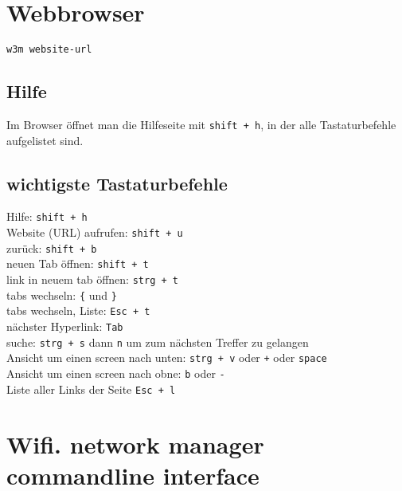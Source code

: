 \documentclass[]{book}
\begin{document}
\hypertarget{webbrowser}{%
\chapter{Webbrowser}\label{webbrowser}}

\begin{verbatim}
w3m website-url
\end{verbatim}

\hypertarget{hilfe-1}{%
\section{Hilfe}\label{hilfe-1}}

Im Browser öffnet man die Hilfeseite mit \texttt{shift\ +\ h}, in der alle Tastaturbefehle aufgelistet sind.

\hypertarget{wichtigste-tastaturbefehle}{%
\section{wichtigste Tastaturbefehle}\label{wichtigste-tastaturbefehle}}

Hilfe: \texttt{shift\ +\ h}\\
Website (URL) aufrufen: \texttt{shift\ +\ u}\\
zurück: \texttt{shift\ +\ b}\\
neuen Tab öffnen: \texttt{shift\ +\ t}\\
link in neuem tab öffnen: \texttt{strg\ +\ t}\\
tabs wechseln: \texttt{\{} und \texttt{\}}\\
tabs wechseln, Liste: \texttt{Esc\ +\ t}\\
nächster Hyperlink: \texttt{Tab}\\
suche: \texttt{strg\ +\ s} dann \texttt{n} um zum nächsten Treffer zu gelangen\\
Ansicht um einen screen nach unten: \texttt{strg\ +\ v} oder \texttt{+} oder \texttt{space}\\
Ansicht um einen screen nach obne: \texttt{b} oder \texttt{-}\\
Liste aller Links der Seite \texttt{Esc\ +\ l}

\hypertarget{wifi.-network-manager-commandline-interface}{%
\chapter{Wifi. network manager commandline interface}\label{wifi.-network-manager-commandline-interface}}
\end{document}
